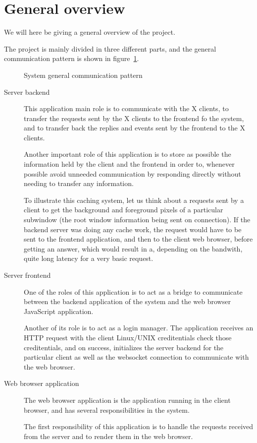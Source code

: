 \section{General overview}
We will here be giving a general overview of the project. 

The project is mainly divided in three different parts, and the general 
communication pattern is shown in figure~\ref{fig:project-overview}.
\begin{figure}[tb]
  \begin{center}
    
    \caption{\label{fig:project-overview}System general communication pattern}
  \end{center}
\end{figure}
\begin{description}
\item[Server backend]
  This application main role is to communicate with the X clients, 
  to transfer the requests sent by the X clients to the frontend fo the system, 
  and to transfer back the replies and events sent by the frontend to the 
  X clients. 
  
  Another important role of this application is to store as possible 
  the information held by the client and the frontend in order to, whenever 
  possible avoid unneeded communication by responding directly without 
  needing to transfer any information.

  To illustrate this caching system, let us think about a requests sent by a 
  client to get the background and foreground pixels of a particular 
  subwindow (the root window information being sent on connection). If the 
  backend server was doing any cache work, the request would have to be 
  sent to the frontend application, and then to the client web browser, before 
  getting an answer, which would result in a, depending on the bandwith, 
  quite long latency for a very basic request.   
  
\item[Server frontend]
  One of the roles of this application  is to act as a bridge to
  communicate between the backend application of the system 
  and the web browser JavaScript application.

  Another of its role is to act as a login manager. The application 
  receives an HTTP request with the client Linux/UNIX creditentials 
  check those creditentials, and on success, initializes the server 
  backend for the particular client as well as the websocket connection 
  to communicate with the web browser.
\item[Web browser application]
  The web browser application is the application running in the client 
  browser, and has several responsibilities in the system.

  The first responsibility of this application is to handle the 
  requests received from the server and to render them in the web 
  browser.
\end{description}



